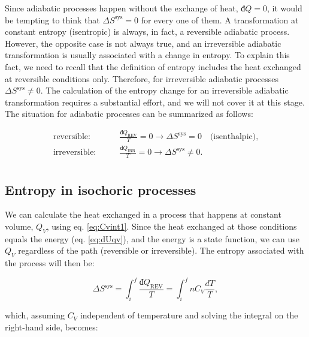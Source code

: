 \documentclass[
  9pt,
]{extbook}
\theoremstyle{definition}
\theoremstyle{definition}
\theoremstyle{definition}
\theoremstyle{remark}
\begin{document}
Since adiabatic processes happen without the exchange of heat, \(đQ=0\), it would be tempting to think that \(\Delta S^{\mathrm{sys}} = 0\) for every one of them. A transformation at constant entropy (isentropic) is always, in fact, a reversible adiabatic process. However, the opposite case is not always true, and an irreversible adiabatic transformation is usually associated with a change in entropy. To explain this fact, we need to recall that the definition of entropy includes the heat exchanged at reversible conditions only. Therefore, for irreversible adiabatic processes \(\Delta S^{\mathrm{sys}} \neq 0\). The calculation of the entropy change for an irreversible adiabatic transformation requires a substantial effort, and we will not cover it at this stage. The situation for adiabatic processes can be summarized as follows:

\begin{equation}
\begin{aligned}
\text{reversible:} \qquad & \frac{đQ_{\mathrm{REV}}}{T} = 0 \longrightarrow \Delta S^{\mathrm{sys}} = 0 \quad \text{(isenthalpic),}\\
\text{irreversible:} \qquad & \frac{đQ_{\mathrm{IRR}}}{T}  = 0 \longrightarrow \Delta S^{\mathrm{sys}} \neq 0. \\
\end{aligned}
\label{eq:adiabaticent}
\end{equation}

\hypertarget{entropy-in-isochoric-processes}{%
\subsection{Entropy in isochoric processes}\label{entropy-in-isochoric-processes}}

We can calculate the heat exchanged in a process that happens at constant volume, \(Q_V\), using eq. \eqref{eq:Cvint1}. Since the heat exchanged at those conditions equals the energy (eq. \eqref{eq:dUqv}), and the energy is a state function, we can use \(Q_V\) regardless of the path (reversible or irreversible). The entropy associated with the process will then be:

\begin{equation}
\Delta S^{\mathrm{sys}} = \int_i^f \frac{đQ_{\mathrm{REV}}}{T} = \int_i^f nC_V \frac{dT}{T},
\label{eq:sconstV1}
\end{equation}

which, assuming \(C_V\) independent of temperature and solving the integral on the right-hand side, becomes:
\end{document}
